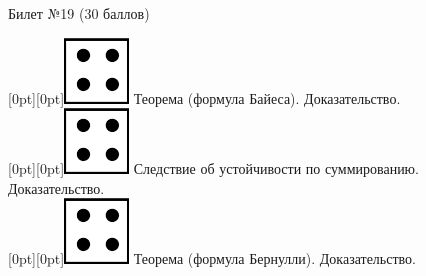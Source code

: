 \documentclass[10pt]{article}
\begin{document}
\thispagestyle{empty}

\topskip=0pt

\vspace*{\fill}

\begin{center} {\Large Билет №19 (30 баллов)} \end{center}

\raisebox{-1pt}[0pt][0pt]{\includegraphics[width=0.02\linewidth]{4.png}} Теорема (формула Байеса). Доказательство. \\

\raisebox{-1pt}[0pt][0pt]{\includegraphics[width=0.02\linewidth]{4.png}} Следствие об устойчивости по суммированию. Доказательство. \\

\raisebox{-1pt}[0pt][0pt]{\includegraphics[width=0.02\linewidth]{4.png}} Теорема (формула Бернулли). Доказательство. \\









\vspace*{\fill}
\end{document}
